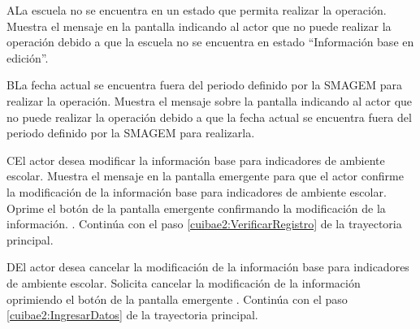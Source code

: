     \begin{UCtrayectoriaA}{A}{La escuela no se encuentra en un estado que permita realizar la operación.}
    \UCpaso[\UCsist] Muestra el mensaje  en la pantalla  indicando al actor que no puede realizar la operación debido a que la escuela no se encuentra en estado ``Información base en edición''. 
 \end{UCtrayectoriaA}

   \begin{UCtrayectoriaA}{B}{La fecha actual se encuentra fuera del periodo definido por la SMAGEM para realizar la operación.}
    \UCpaso[\UCsist] Muestra el mensaje  sobre la pantalla  indicando al actor que no puede realizar la operación debido a que la fecha actual se encuentra fuera del periodo definido por la SMAGEM para realizarla. 
 \end{UCtrayectoriaA}
 
  \begin{UCtrayectoriaA}{C}{El actor desea modificar la información base para indicadores de ambiente escolar.}
    \UCpaso[\UCsist] Muestra el mensaje  en la pantalla emergente  para que el actor confirme la modificación de la información base para indicadores de ambiente escolar.
    \UCpaso[\UCactor] Oprime el botón  de la pantalla emergente  confirmando la modificación de la información. .
    \UCpaso[] Continúa con el paso \ref{cuibae2:VerificarRegistro} de la trayectoria principal.    
 \end{UCtrayectoriaA}
 
   \begin{UCtrayectoriaA}{D}{El actor desea cancelar la modificación de la información base para indicadores de ambiente escolar.}
    \UCpaso[\UCactor] Solicita cancelar la modificación de la información oprimiendo el botón  de la pantalla emergente .
    \UCpaso[] Continúa con el paso \ref{cuibae2:IngresarDatos} de la trayectoria principal.    
 \end{UCtrayectoriaA}
 
